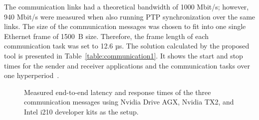     The communication links had a theoretical bandwidth of 1000 Mbit/s; however, 940 Mbit/s were measured when also running PTP synchronization over the same links.
    The size of the communication messages was chosen to fit into one single Ethernet frame of 1500~B size. Therefore, the frame length of each communication task was set to 12.6 µs.
    The solution calculated by the proposed tool is presented in Table~\ref{table:communication1}. It shows the start and stop times for the sender and receiver applications and the communication tasks over one hyperperiod~\cite{askaripoor2023designer}.


     \begin{figure}[ht]
	\centering
	\caption{Measured end-to-end latency and response times of the three communication messages using Nvidia Drive AGX, Nvidia TX2, and Intel i210 developer kits as the setup.}
	\label{fig:end_to_end_latency}
    \end{figure}

